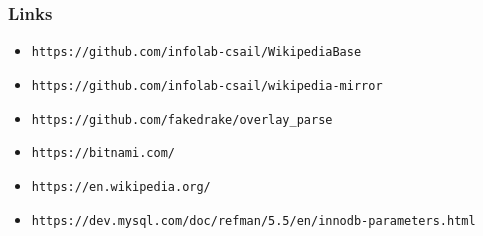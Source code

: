 \documentclass[bigger]{beamer}
\begin{document}
\begin{frame}
  \frametitle{Links}
  \begin{itemize}
  \item \texttt{https://github.com/infolab-csail/WikipediaBase}
  \item \texttt{https://github.com/infolab-csail/wikipedia-mirror}
  \item \texttt{https://github.com/fakedrake/overlay\_parse}
  \item \texttt{https://bitnami.com/}
  \item \texttt{https://en.wikipedia.org/}
  \item \texttt{https://dev.mysql.com/doc/refman/5.5/en/innodb-parameters.html}
  \end{itemize}
\end{frame}
\end{document}
